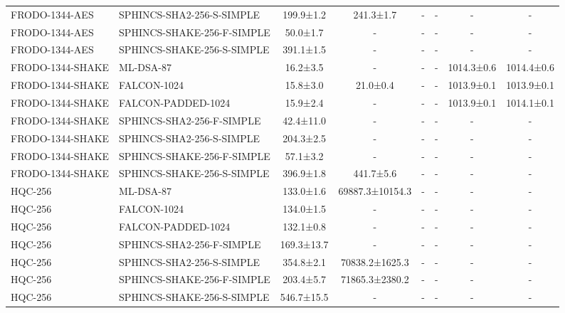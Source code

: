 \documentclass[10pt]{article}
\begin{document}
\begin{tabular}{@{}l l c c c c c c@{}}
FRODO-1344-AES & SPHINCS-SHA2-256-S-SIMPLE & 199.9±1.2 & 241.3±1.7 & - & - & - & - \\
FRODO-1344-AES & SPHINCS-SHAKE-256-F-SIMPLE & 50.0±1.7 & - & - & - & - & - \\
FRODO-1344-AES & SPHINCS-SHAKE-256-S-SIMPLE & 391.1±1.5 & - & - & - & - & - \\
FRODO-1344-SHAKE & ML-DSA-87 & 16.2±3.5 & - & - & - & 1014.3±0.6 & 1014.4±0.6 \\
FRODO-1344-SHAKE & FALCON-1024 & 15.8±3.0 & 21.0±0.4 & - & - & 1013.9±0.1 & 1013.9±0.1 \\
FRODO-1344-SHAKE & FALCON-PADDED-1024 & 15.9±2.4 & - & - & - & 1013.9±0.1 & 1014.1±0.1 \\
FRODO-1344-SHAKE & SPHINCS-SHA2-256-F-SIMPLE & 42.4±11.0 & - & - & - & - & - \\
FRODO-1344-SHAKE & SPHINCS-SHA2-256-S-SIMPLE & 204.3±2.5 & - & - & - & - & - \\
FRODO-1344-SHAKE & SPHINCS-SHAKE-256-F-SIMPLE & 57.1±3.2 & - & - & - & - & - \\
FRODO-1344-SHAKE & SPHINCS-SHAKE-256-S-SIMPLE & 396.9±1.8 & 441.7±5.6 & - & - & - & - \\
HQC-256 & ML-DSA-87 & 133.0±1.6 & 69887.3±10154.3 & - & - & - & - \\
HQC-256 & FALCON-1024 & 134.0±1.5 & - & - & - & - & - \\
HQC-256 & FALCON-PADDED-1024 & 132.1±0.8 & - & - & - & - & - \\
HQC-256 & SPHINCS-SHA2-256-F-SIMPLE & 169.3±13.7 & - & - & - & - & - \\
HQC-256 & SPHINCS-SHA2-256-S-SIMPLE & 354.8±2.1 & 70838.2±1625.3 & - & - & - & - \\
HQC-256 & SPHINCS-SHAKE-256-F-SIMPLE & 203.4±5.7 & 71865.3±2380.2 & - & - & - & - \\
HQC-256 & SPHINCS-SHAKE-256-S-SIMPLE & 546.7±15.5 & - & - & - & - & - \\
\bottomrule
\end{tabular}
\end{document}
